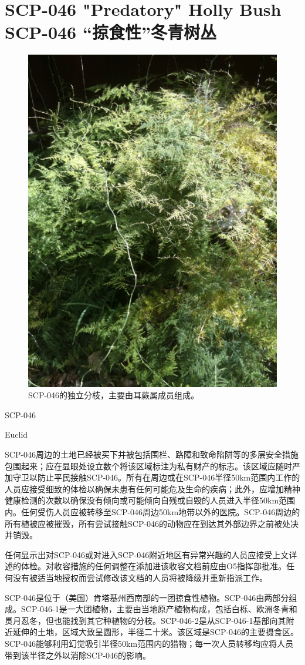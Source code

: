 \chapter[SCP-046 “掠食性”冬青树丛]{
    SCP-046 "Predatory" Holly Bush\\
    SCP-046 “掠食性”冬青树丛
}

\label{chap:SCP-046}

\begin{figure}[H]
    \centering
    \includegraphics[width=0.5\linewidth]{images/SCP.046.jpg}
    \caption*{SCP-046的独立分枝，主要由耳蕨属成员组成。}
\end{figure}

SCP-046

Euclid

SCP-046周边的土地已经被买下并被包括围栏、路障和致命陷阱等的多层安全措施包围起来；应在显眼处设立数个将该区域标注为私有财产的标志。该区域应随时严加守卫以防止平民接触SCP-046。所有在周边或在SCP-046半径50km范围内工作的人员应接受细致的体检以确保未患有任何可能危及生命的疾病；此外，应增加精神健康检测的次数以确保没有倾向或可能倾向自残或自毁的人员进入半径50km范围内。任何受伤人员应被转移至SCP-046周边50km地带以外的医院。SCP-046周边的所有植被应被摧毁，所有尝试接触SCP-046的动物应在到达其外部边界之前被处决并销毁。

任何显示出对SCP-046或对进入SCP-046附近地区有异常兴趣的人员应接受上文详述的体检。对收容措施的任何调整在添加进该收容文档前应由O5指挥部批准。任何没有被适当地授权而尝试修改该文档的人员将被降级并重新指派工作。

SCP-046是位于（美国）肯塔基州西南部的一团掠食性植物。SCP-046由两部分组成。SCP-046-1是一大团植物，主要由当地原产植物构成，包括白栎、欧洲冬青和贯月忍冬，但也能找到其它种植物的分枝。SCP-046-2是从SCP-046-1基部向其附近延伸的土地，区域大致呈圆形，半径二十米。该区域是SCP-046的主要摄食区。SCP-046能够利用幻觉吸引半径50km范围内的猎物；每一次人员转移均应将人员带到该半径之外以消除SCP-046的影响。

